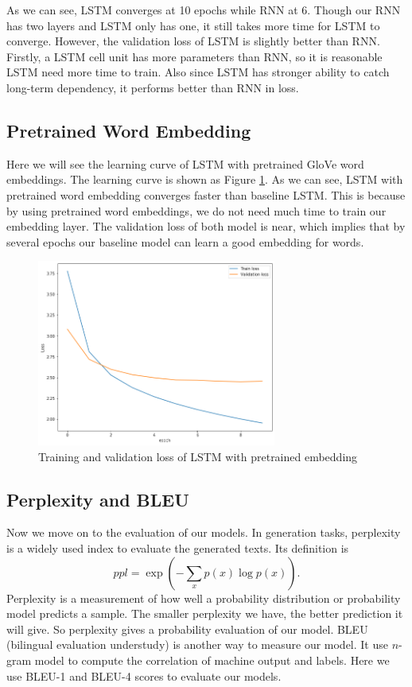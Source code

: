 \documentclass{article} %
\begin{document}
As we can see, LSTM converges at 10 epochs while RNN at 6. Though our RNN has two layers and LSTM only has one, it still takes more time for LSTM to converge. However, the validation loss of LSTM is slightly better than RNN. Firstly, a LSTM cell unit has more parameters than RNN, so it is reasonable LSTM need more time to train. Also since LSTM has stronger ability to catch long-term dependency, it performs better than RNN in loss. 

\subsection{Pretrained Word Embedding}

Here we will see the learning curve of LSTM with pretrained GloVe word embeddings. The learning curve is shown as Figure \ref{LSTM_pre_loss}. As we can see, LSTM with pretrained word embedding converges faster than baseline LSTM. This is because by using pretrained word embeddings, we do not need much time to train our embedding layer. The validation loss of both model is near, which implies that by several epochs our baseline model can learn a good embedding for words. 


\begin{figure}[htb!]
    \centering
     \includegraphics[width=0.7\textwidth]{LSTM_pretrainedloss}
    \caption{Training and validation loss of LSTM with pretrained embedding}
    \label{LSTM_pre_loss}
\end{figure}

\subsection{Perplexity and BLEU}

Now we move on to the evaluation of our models. In generation tasks, perplexity is a widely used index to evaluate the generated texts. Its definition is
\begin{equation}
    ppl = \exp (-\sum_x p(x)\log p(x)).
\end{equation}
Perplexity is a measurement of how well a probability distribution or probability model predicts a sample. The smaller perplexity we have, the better prediction it will give. So perplexity gives a probability evaluation of our model. BLEU (bilingual evaluation understudy) \cite{papineni2002bleu} is another way to measure our model. It use $n$-gram model to compute the correlation of machine output and labels. Here we use BLEU-1 and BLEU-4 scores to evaluate our models.
\end{document}
